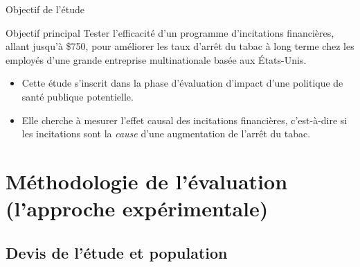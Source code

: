 \documentclass[aspectratio=169,xcolor=dvipsnames]{beamer}
\begin{document}
\begin{frame}{Objectif de l'étude}
    \begin{block}{Objectif principal}
        Tester l'efficacité d'un programme d'incitations financières, allant jusqu'à \$750, pour améliorer les taux d'arrêt du tabac à long terme chez les employés d'une grande entreprise multinationale basée aux États-Unis.
    \end{block}
    \bigskip
    \begin{itemize}
        \item Cette étude s'inscrit dans la phase d'évaluation d'impact d'une politique de santé publique potentielle.
        \item Elle cherche à mesurer l'effet causal des incitations financières, c'est-à-dire si les incitations sont la \textit{cause} d'une augmentation de l'arrêt du tabac.
    \end{itemize}
\end{frame}

\section{Méthodologie de l'évaluation (l'approche expérimentale)}
\subsection{Devis de l'étude et population}
\end{document}
